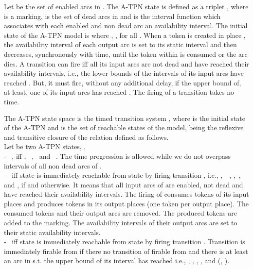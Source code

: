 \documentclass[submission,copyright,creativecommons]{eptcs}
\numberwithin{equation}{section}
\begin{document}
\par Let  be the set of enabled arcs in . The A-TPN state is defined as a triplet , where  is a
marking,  is the set of dead arcs in  and  is the interval function  which associates with each enabled and non dead arc an availability interval. The initial state of the A-TPN model is  where , , for all . When a token is created in place , the availability interval of each output arc  is set to its static interval  and then decreases,  synchronously with time, until the token within  is consumed or the arc dies. A transition  can fire iff all its input arcs are not dead and have reached their availability intervals, i.e., the lower bounds of the intervals of its input arcs have reached . But, it must fire, without any additional delay, if the upper bound of, at least, one of its input arcs has reached . The firing of a transition takes no time.
\par The A-TPN state space is the timed transition system , where  is the initial state of
the A-TPN and 
 is the set of reachable states of the model,  being the reflexive and transitive closure  of the relation  defined as follows.\\
Let  be two A-TPN states, ,\\ - \ , iff , \ ,  \ and \
. The time progression is allowed while we do not overpass intervals of all non dead arcs of .\\ - \  iff  state  is immediately reachable from state  by firing transition , i.e.,
,\ \ ,
 ,\ ,
 and ,   if  and 
 otherwise. It means that all input arcs of  are enabled, not dead and  have reached their availability intervals. The firing of  consumes tokens of its input places and produces tokens in its output places (one token per output place). The consumed tokens and their output arcs are removed. The produced tokens are added to the marking. The availability intervals of their output arcs are set to their static availability intervals.\\
- \  iff  state  is immediately
reachable from state  by firing transition . Transition  is immediately firable from  if there no transition of  firable from  and there is at least an arc in  s.t. the upper bound of its interval has reached  i.e., , ,
 , ,  and (, ).
\end{document}
